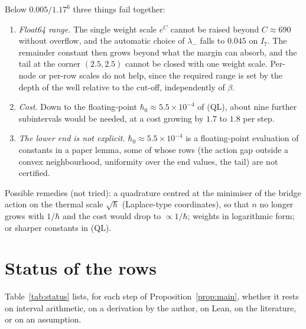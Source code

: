 \documentclass[11pt,a4paper]{article}
\theoremstyle{definition}
\theoremstyle{remark}
\begin{document}
Below $0.005/1.17^6$ three things fail together:
\begin{enumerate}[leftmargin=2em]
\item \emph{Float64 range.} The single weight scale $e^{C}$ cannot be raised beyond $C\approx690$ without overflow, and the automatic choice of $\lambda_-$ falls to $0.045$ on $I_7$. The remainder constant then grows beyond what the margin can absorb, and the tail at the corner $(2.5,2.5)$ cannot be closed with one weight scale. Per-node or per-row scales do not help, since the required range is set by the depth of the well relative to the cut-off, independently of $\beta$.
\item \emph{Cost.} Down to the floating-point $\hbar_0\approx5.5\times10^{-4}$ of (QL), about nine further subintervals would be needed, at a cost growing by $1.7$ to $1.8$ per step.
\item \emph{The lower end is not explicit.} $\hbar_0\approx5.5\times10^{-4}$ is a floating-point evaluation of constants in a paper lemma, some of whose rows (the action gap outside a convex neighbourhood, uniformity over the end values, the tail) are not certified.
\end{enumerate}
Possible remedies (not tried): a quadrature centred at the minimiser of the bridge action on the thermal scale $\sqrt\hbar$ (Laplace-type coordinates), so that $n$ no longer grows with $1/\hbar$ and the cost would drop to $\propto1/\hbar$; weights in logarithmic form; or sharper constants in (QL).

\section{Status of the rows}\label{sec:statusrows}

Table~\ref{tab:status} lists, for each step of Proposition~\ref{prop:main}, whether it rests on interval arithmetic, on a derivation by the author, on Lean, on the literature, or on an assumption.
\end{document}
